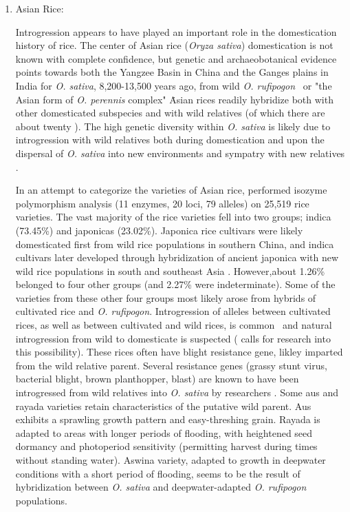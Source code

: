 \documentclass[11pt]{article}
\begin{document}
\begin{enumerate}
\item{Asian Rice:}




Introgression appears to have played an important role in the domestication history of rice.
The center of Asian rice (\emph{Oryza sativa}) domestication is not known with complete confidence, but genetic and archaeobotanical evidence points towards both the Yangzee Basin in China and the Ganges plains in India for \emph{O. sativa}, 8,200-13,500 years ago, from wild \emph{O. rufipogon}  \cite{oka2012origin, fuller2010consilience, ricepedia, molina2011molecular}\ or "the Asian form of \emph{O. perennis} complex" \cite{oka2012origin}\.
Asian rices readily hybridize both with other domesticated subspecies and with wild relatives (of which there are about twenty \cite{ricepedia}).
The high genetic diversity within \emph{O. sativa} is likely due to introgression with wild relatives both during domestication and upon the dispersal of \emph{O. sativa} into new environments and sympatry with new relatives \cite{second1982origin}.

In an attempt to categorize the varieties of Asian rice, \cite{khush2003classifying} performed isozyme polymorphism analysis (11 enzymes, 20 loci, 79 alleles) on 25,519 rice varieties.
The vast majority of the rice varieties fell into two groups; indica (73.45\%) and japonicas (23.02\%).
Japonica rice cultivars were likely domesticated first from wild rice populations in southern China, and indica cultivars later developed through hybridization of ancient japonica with new wild rice populations in south and southeast Asia \cite{Huang2012, londo2006phylogeography}.
However,about 1.26\% belonged to four other groups (and 2.27\% were indeterminate).
Some of the varieties from these other four groups most likely arose from hybrids of cultivated rice and \emph{O. rufipogon}.
Introgression of alleles between cultivated rices, as well as between cultivated and wild rices, is common \cite{oka2012origin, second1982origin, zhao2010genomic}\, and natural introgression from wild to domesticate is suspected (\cite{zhao2010genomic} calls for research into this possibility).
These rices often have blight resistance gene, likley imparted from the wild relative parent.
Several resistance genes (grassy stunt virus, bacterial blight, brown planthopper, blast) are known to have been introgressed from wild relatives into \emph{O. sativa} by researchers \cite{brar1997alien, khush1974inheritance}.
Some aus and rayada varieties retain characteristics of the putative wild parent.
Aus exhibits a sprawling growth pattern and easy-threshing grain.
Rayada is adapted to areas with longer periods of flooding, with heightened seed dormancy and photoperiod sensitivity (permitting harvest during times without standing water).
Aswina variety, adapted to growth in deepwater conditions with a short period of flooding, seems to be the result of hybridization between \emph{O. sativa} and deepwater-adapted \emph{O. rufipogon} populations.


\end{enumerate}
\end{document}
